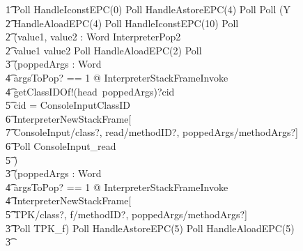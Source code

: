 \begin{figure}
\begin{circus}
    \t1 Poll \circseq HandleIconstEPC(0) \circseq Poll \circseq HandleAstoreEPC(4) \circseq Poll \circseq Poll \circseq (\circmu Y \circspot \\
    \t2 HandleAloadEPC(4) \circseq Poll \circseq HandleIconstEPC(10) \circseq Poll \circseq \\
    \t2 (\circvar value1, value2 : Word \circspot InterpreterPop2 \circseq \\
    \t2 \circif value1 \leq value2 \circthen Poll \circseq HandleAloadEPC(2) \circseq Poll \circseq \\
    \t3 (\circvar poppedArgs : \seq Word \circspot \\
    \t4 \lschexpract \exists argsToPop? == 1 @ InterpreterStackFrameInvoke \rschexpract \circseq \\
    \t4 getClassIDOf!(head~poppedArgs)?cid \then {} \\
    \t5 \circif cid = ConsoleInputClassID \circthen {} \\
    \t6 \lschexpract InterpreterNewStackFrame[\\
    \t7 ConsoleInput/class?, read/methodID?, poppedArgs/methodArgs?] \rschexpract \circseq \\
    \t6 Poll \circseq ConsoleInput\_read \\
    \t5 \circfi) \circseq \\
    \t3 (\circvar poppedArgs : \seq Word \circspot \\
    \t4 \lschexpract \exists argsToPop? == 1 @ InterpreterStackFrameInvoke \rschexpract \circseq \\
    \t4 \lschexpract InterpreterNewStackFrame[\\
    \t5 TPK/class?, f/methodID?, poppedArgs/methodArgs?] \rschexpract \circseq \\
    \t3 Poll \circseq TPK\_f) \circseq Poll \circseq HandleAstoreEPC(5) \circseq Poll \circseq HandleAloadEPC(5) \circseq \\
    \t3 {} \cdots {} \\

\end{circus}
\end{figure}
